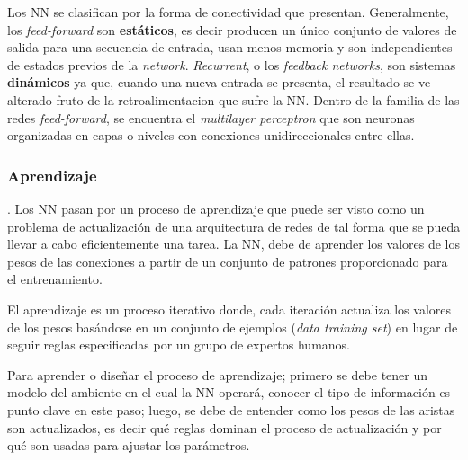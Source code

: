 Los NN se clasifican por la forma de conectividad que presentan. Generalmente,
los \textit{feed-forward} son \textbf{estáticos}, es decir producen un único 
conjunto de valores de salida para una secuencia de entrada, usan menos
memoria y son independientes de estados previos de la \textit{network}. 
\textit{Recurrent}, o los \textit{feedback networks}, son sistemas 
\textbf{dinámicos} ya que, cuando una nueva entrada se presenta, el resultado
se ve alterado fruto de la retroalimentacion que sufre la NN. Dentro de la 
familia de las redes \textit{feed-forward}, se encuentra el \textit{multilayer
perceptron} que son neuronas organizadas en capas o niveles con conexiones 
unidireccionales entre ellas.

\subsubsection{Aprendizaje}.
Los NN pasan por un proceso de aprendizaje que puede ser visto como un
problema de actualización de una arquitectura de redes de tal forma que se 
pueda llevar a cabo eficientemente una tarea. La NN, debe de aprender los
valores de los pesos de las conexiones a partir de un conjunto de patrones 
proporcionado para el entrenamiento. 

El aprendizaje es un proceso iterativo donde, cada iteración actualiza los
valores de los pesos basándose en un conjunto de ejemplos (\textit{data 
training set}) en lugar de seguir reglas especificadas por un grupo de 
expertos humanos.

Para aprender o diseñar el proceso de aprendizaje; primero se debe tener un 
modelo del ambiente en el cual la NN operará, conocer el tipo de información
es punto clave en este paso; luego, se debe de entender como los pesos de las 
aristas son actualizados, es decir qué reglas dominan el proceso de 
actualización y por qué son usadas para ajustar los parámetros.

